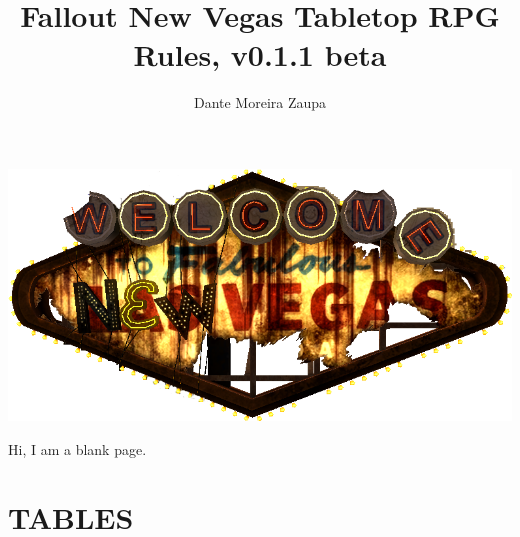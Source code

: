 \documentclass[11pt]{article} %
\title{Fallout New Vegas Tabletop RPG Rules, v0.1.1 beta}
\author{Dante Moreira Zaupa}
\begin{document}
\maketitle
\begin{center}
\includegraphics[scale=0.5]{logo_new_vegas.png}
\end{center}
\newpage
\tableofcontents
\newpage
\listoftables
\newpage


 
 \newpage



\newpage



\newpage



\newpage



\newpage



\newpage
Hi, I am a blank page.
\newpage

\appendix
\addtolength{\oddsidemargin}{-0.9in}
\addtolength{\evensidemargin}{-0.9in}
\addtolength{\textwidth}{1.8in}
\section{TABLES}
	
	\label{app:traits}
	
	\label{app:perks}
	
\end{document}
